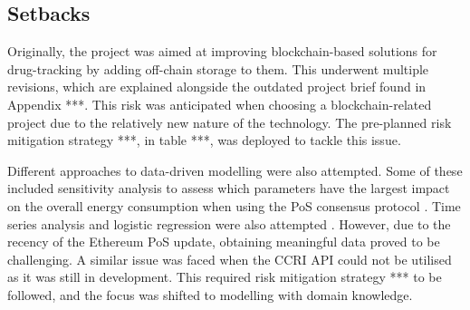 \subsection{Setbacks}

Originally, the project was aimed at improving blockchain-based solutions for drug-tracking by adding off-chain storage to them. This underwent multiple revisions, which are explained alongside the outdated project brief found in Appendix ***. This risk was anticipated when choosing a blockchain-related project due to the relatively new nature of the technology. The pre-planned risk mitigation strategy ***, in table ***,  was deployed to tackle this issue.

Different approaches to data-driven modelling were also attempted. Some of these included sensitivity analysis to assess which parameters have the largest impact on the overall energy consumption when using the PoS consensus protocol \cite{MarionAnModelling}. Time series analysis and logistic regression were also attempted \cite{IbanezTheExpansion}. However, due to the recency of the Ethereum PoS update, obtaining meaningful data proved to be challenging. A similar issue was faced when the CCRI API could not be utilised as it was still in development. This required risk mitigation strategy *** to be followed, and the focus was shifted to modelling with domain knowledge. 


